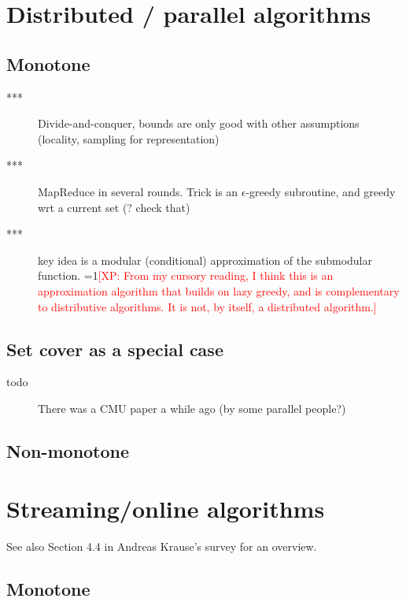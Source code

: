 \documentclass{article}
\newcommand{\Comments}{1}
\newcommand{\note}[2]{\ifnum\Comments=1\textcolor{#1}{#2}\fi}
\newcommand{\xinghao}[1]{\note{red}{[XP: #1]}}
\begin{document}
\section{Distributed / parallel algorithms}

\subsection{Monotone}

\begin{description}
\item[\citet{Mirzasoleiman2013}***] Divide-and-conquer, bounds are only good with other assumptions (locality, sampling for representation)
\item[\citet{kumar13}***] MapReduce in several rounds. Trick is an $\epsilon$-greedy subroutine, and greedy wrt a current set (? check that)
\item[\citet{wei14}***] key idea is a modular (conditional) approximation of the submodular function. \xinghao{From my cursory reading, I think this is an approximation algorithm that builds on lazy greedy, and is complementary to distributive algorithms. It is not, by itself, a distributed algorithm.}
\end{description}

\subsection{Set cover as a special case}

\begin{description}
\item[todo] There was a CMU paper a while ago (by some parallel people?)
\end{description}

\subsection{Non-monotone}



\section{Streaming/online algorithms}

See also Section 4.4 in Andreas Krause's survey for an overview.

\subsection{Monotone}
\end{document}
